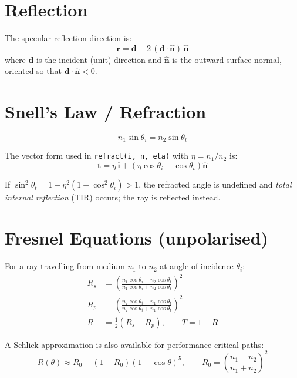 \documentclass[12pt,a4paper]{report}
\begin{document}
\section{Reflection}

The specular reflection direction is:
\begin{equation}
  \mathbf{r} = \mathbf{d} - 2\,(\mathbf{d}\cdot\hat{\mathbf{n}})\,\hat{\mathbf{n}}
\end{equation}
where $\mathbf{d}$ is the incident (unit) direction and $\hat{\mathbf{n}}$ is the outward
surface normal, oriented so that $\mathbf{d}\cdot\hat{\mathbf{n}} < 0$.

\section{Snell's Law / Refraction}

\begin{equation}
  n_1 \sin\theta_i = n_2 \sin\theta_t
\end{equation}

The vector form used in \texttt{refract(i, n, eta)} with $\eta = n_1/n_2$ is:
\begin{equation}
  \mathbf{t} = \eta\,\mathbf{i} + \left(\eta\cos\theta_i - \cos\theta_t\right)\hat{\mathbf{n}}
\end{equation}

If $\sin^2\theta_t = 1 - \eta^2(1 - \cos^2\theta_i) > 1$, the refracted angle is undefined
and \emph{total internal reflection} (TIR) occurs; the ray is reflected instead.

\section{Fresnel Equations (unpolarised)}

For a ray travelling from medium $n_1$ to $n_2$ at angle of incidence $\theta_i$:
\begin{align}
  R_s &= \left(\frac{n_1\cos\theta_i - n_2\cos\theta_t}{n_1\cos\theta_i + n_2\cos\theta_t}\right)^2 \\[4pt]
  R_p &= \left(\frac{n_2\cos\theta_i - n_1\cos\theta_t}{n_2\cos\theta_i + n_1\cos\theta_t}\right)^2 \\[4pt]
  R   &= \tfrac{1}{2}(R_s + R_p), \qquad T = 1 - R
\end{align}

A Schlick approximation is also available for performance-critical paths:
\begin{equation}
  R(\theta) \approx R_0 + (1-R_0)(1 - \cos\theta)^5, \qquad
  R_0 = \left(\frac{n_1-n_2}{n_1+n_2}\right)^2
\end{equation}
\end{document}
